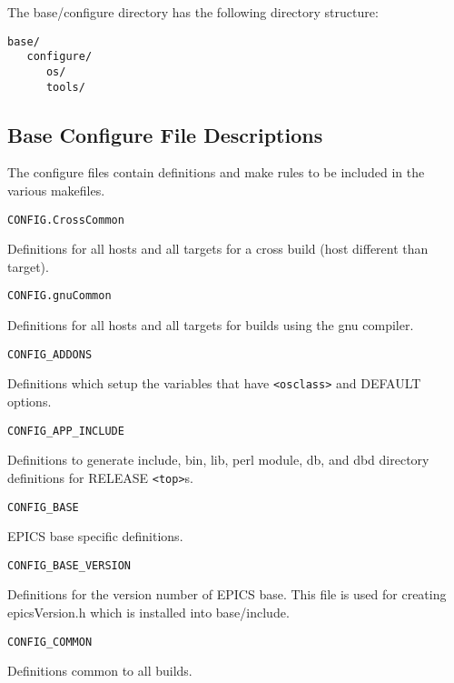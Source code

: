 The base/configure directory has the following directory structure:

\begin{verbatim}
base/
   configure/
      os/
      tools/
\end{verbatim}

\subsection{Base Configure File Descriptions}

The configure files contain definitions and make rules to be included in the various makefiles.

\begin{description}

\item {}\verb|CONFIG.CrossCommon|

Definitions for all hosts and all targets for a cross build (host different than target).

\item {}\verb|CONFIG.gnuCommon|

Definitions for all hosts and all targets for builds using the gnu compiler.

\item {}\verb|CONFIG_ADDONS|

Definitions which setup the variables that have \verb|<osclass>| and DEFAULT options.

\item {}\verb|CONFIG_APP_INCLUDE|

Definitions to generate include, bin, lib, perl module, db, and dbd directory definitions for RELEASE \verb|<top>|s.

\item {}\verb|CONFIG_BASE|

EPICS base specific definitions.

\item {}\verb|CONFIG_BASE_VERSION|

Definitions for the version number of EPICS base. This file is used for creating epicsVersion.h which is installed 
into base/include.

\item {}\verb|CONFIG_COMMON|

Definitions common to all builds.


\end{description}

